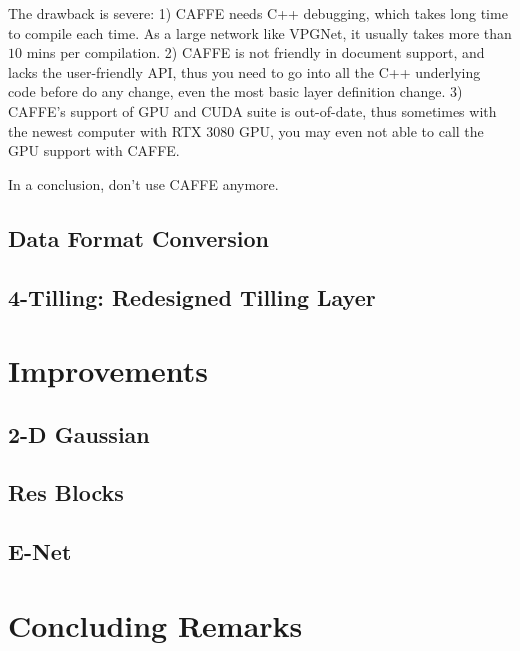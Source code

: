 \begin{spacing}{1.5}
The drawback is severe: 1) CAFFE needs C++ debugging, which takes long time to compile each time. As a large network like VPGNet, it usually takes more than $10$ mins per compilation. 2) CAFFE is not friendly in document support, and lacks the user-friendly API, thus you need to go into all the C++ underlying code before do any change, even the most basic layer definition change. 3) CAFFE's support of GPU and CUDA suite is out-of-date, thus sometimes with the newest computer with RTX 3080 GPU, you may even not able to call the GPU support with CAFFE.

In a conclusion, don't use CAFFE anymore.

\subsection{Data Format Conversion}

\subsection{4-Tilling: Redesigned Tilling Layer}



\section{Improvements}
\label{sec:MD_improvement}
\setlength{\parskip}{0.3in}

\subsection{2-D Gaussian}
\label{subsec:IM_2D}

\subsection{Res Blocks}
\label{subsec:IM_resblock}

\subsection{E-Net}
\label{subsec:IM_Enet}



\section{Concluding Remarks}




\end{spacing}
\newpage

